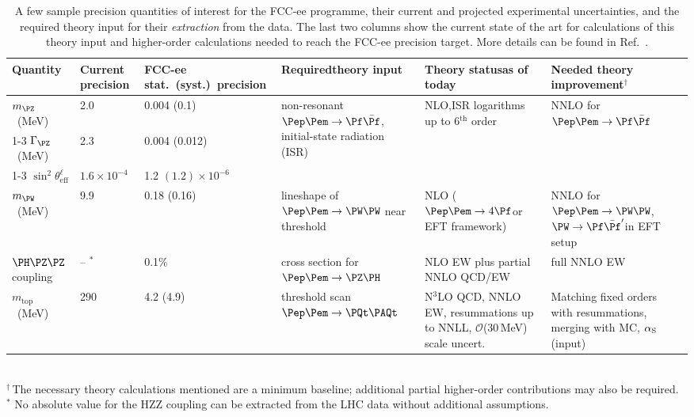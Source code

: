 \setlength{\tabcolsep}{6pt}
\begin{table}[ht]
\caption{A few sample precision quantities of interest for the FCC-ee programme, 
their current and projected experimental uncertainties, 
and the required theory input for their \emph{extraction} from the data. 
The last two columns show the current state of the art for calculations of this theory input
and higher-order calculations needed to reach the FCC-ee precision target.
More details can be found in Ref.~\cite{Freitas:2019bre}.}
\label{tab:obs1}
\setlength{\tabcolsep}{5pt}
\begin{tabular}{p{1.8cm}p{1.6cm}p{2.8cm}p{2.7cm}p{2.5cm}p{2.5cm}@{}p{0cm}}
\toprule
Quantity & Current precision & \raggedright FCC-ee stat.\ (syst.)~precision 
& \raggedright Required\newline theory input & \raggedright Theory status\newline as of today & \raggedright Needed theory improvement$^\dagger$ & \\
\midrule
$m_{\PZ}$~(MeV) & 2.0 & 0.004 (0.1) 
& \multirow{3}{2.7cm}{non-resonant $\epem \to \Pf\bar{\Pf}$, initial-state radiation (ISR)} 
& \multirow{3}{2.5cm}{NLO,\newline ISR logarithms up to 6$^\text{th}$ order} & \multirow{3}{2.8cm}{NNLO for $\epem \to \Pf\bar{\Pf}$ } \\[.7ex]
\cmidrule(r){1-3}
$\Gamma_{\PZ}$~(MeV) & 2.3 & 0.004 (0.012) & & & \\[.7ex]
\cmidrule(r){1-3} 
$\sin^2\theta_\text{eff}^\ell$ & $1.6\times 10^{-4}$ & 1.2 $(1.2) \times 10^{-6}$ & & & \\[1ex]
\midrule
$m_{\PW}$~(MeV) & 9.9 & 0.18 (0.16) 
& \raggedright lineshape of $\epem \to \PW\PW$ near threshold 
& \raggedright NLO ($\epem \to 4\Pf$\newline or EFT framework) 
& \raggedright NNLO for $\epem \to \PW\PW$, $\PW \to \Pf\bar{\Pf}'$\newline in EFT setup & \\
\midrule
\raggedright $\PH\PZ\PZ$ coupling & \raggedright -- $^\ast$  & 0.1\% 
& \raggedright cross section for $\epem \to \PZ\PH$ & \raggedright NLO EW plus partial NNLO QCD/EW & \raggedright full NNLO EW & \\
\midrule
$m_\text{top}$~(MeV) & 290 & 4.2 (4.9) & \raggedright threshold scan $\epem \to \PQt \PAQt$ 
& \raggedright N$^3$LO QCD, NNLO EW, resummations up to NNLL, $\mathcal{O}$(30\,MeV) scale uncert.\ 
& \raggedright Matching fixed orders with resum\-mations, merging with MC, $\alpha_{\rm S}$ (input) & \\
\bottomrule
\end{tabular}\\
\footnotesize{$^\dagger$\,The necessary theory calculations mentioned are a minimum baseline; 
additional partial higher-order contributions may also be required.}\\
\footnotesize{$^\ast$ No absolute value for the HZZ coupling can be extracted from the LHC data without additional assumptions.}
\end{table}

